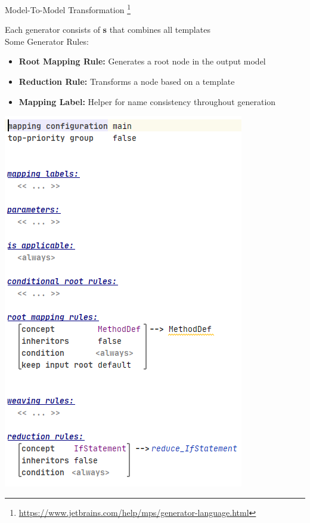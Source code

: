 	\begin{frame}{Model-To-Model Transformation \footnote[10]{\url{https://www.jetbrains.com/help/mps/generator-language.html}}}
		\begin{minipage}{0.52\textwidth}
			Each generator consists of \textbf{\workshopconfiguration s} that combines all templates\\
			
			Some Generator Rules:\\
			\begin{itemize}
				\item \textbf{Root Mapping Rule:} Generates a root node in the output model
				\item \textbf{Reduction Rule:} Transforms a node based on a template
				\item \textbf{Mapping Label:} Helper for name consistency throughout generation
			\end{itemize}
		\end{minipage}
		\begin{minipage}{0.4\textwidth}
			\includegraphics[height=0.75\textheight]{illustrations/mapping.png}
		\end{minipage}
	\end{frame}

